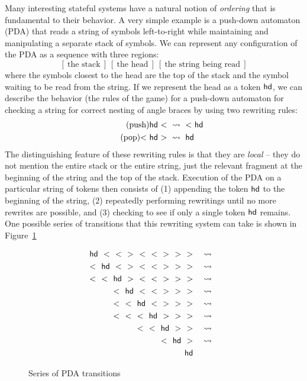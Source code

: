 Many interesting stateful systems have a natural notion of {\it
  ordering} that is fundamental to their behavior. A very simple
example is a push-down automaton (PDA) that reads a string of symbols
left-to-right while maintaining and manipulating a separate stack of
symbols. We can represent any configuration of the PDA as a sequence
with three regions:
\[
[~\mbox{the stack}~]
~
[~\mbox{the head}~]
~
[~\mbox{the string being read}~]
\]
where the symbols closest to the head are the top of the stack and the
symbol waiting to be read from the string. If we represent the head as
a token ${\sf hd}$, we can describe the behavior (the rules of the
game) for a push-down automaton for checking a string for correct
nesting of angle braces by using two rewriting rules:
\begin{align}
\tag{push} {\sf hd}~{<} ~&\rightsquigarrow~ {<}~{\sf hd}
\\
\tag{pop} {<}~{\sf hd}~{>} ~&\rightsquigarrow~ {\sf hd}
\end{align}
The distinguishing feature of these rewriting rules is that they are
{\it local} -- they do not mention the entire stack or the entire
string, just the relevant fragment at the beginning of the string and
the top of the stack. Execution of the PDA on a particular string of
tokens then consists of (1) appending the token ${\sf hd}$ to the
beginning of the string, (2) repeatedly performing rewritings until no
more rewrites are possible, and (3) checking to see if only a single
token ${\sf hd}$ remains. One possible series of transitions that this
rewriting system can take is shown in Figure~\ref{fig:pda-transitions}

\begin{figure}
\begin{align*}
{\sf hd}~~{<}~~{<}~~{>}~~{<}~~{<}~~{>}~~{>}~~{>}
& ~~~\rightsquigarrow~~\\
{<}~~{\sf hd}~~{<}~~{>}~~{<}~~{<}~~{>}~~{>}~~{>}
& ~~~\rightsquigarrow~~\\
{<}~~{<}~~{\sf hd}~~{>}~~{<}~~{<}~~{>}~~{>}~~{>}
& ~~~\rightsquigarrow~~\\
{<}~~{\sf hd}~~{<}~~{<}~~{>}~~{>}~~{>}
& ~~~\rightsquigarrow~~\\
{<}~~{<}~~{\sf hd}~~{<}~~{>}~~{>}~~{>}
& ~~~\rightsquigarrow~~\\
{<}~~{<}~~{<}~~{\sf hd}~~{>}~~{>}~~{>}
& ~~~\rightsquigarrow~~\\
{<}~~{<}~~{\sf hd}~~{>}~~{>}
& ~~~\rightsquigarrow~~\\
{<}~~{\sf hd}~~{>}
& ~~~\rightsquigarrow~~\\
{\sf hd} &
\end{align*}
\caption{Series of PDA transitions}
\label{fig:pda-transitions}
\end{figure}

